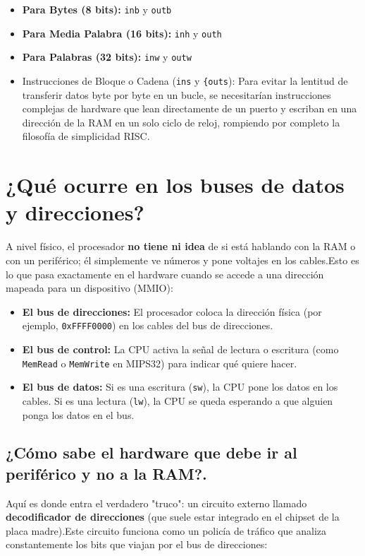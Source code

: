 \documentclass{article}
\begin{document}
\begin{itemize}
    \item \textbf{Para Bytes (8 bits):} \verb|inb| y \verb|outb|
    \item \textbf{Para Media Palabra (16 bits):} \verb|inh| y \verb|outh|
    \item \textbf{Para Palabras (32 bits):} \verb|inw| y \verb|outw|
    \item Instrucciones de Bloque o Cadena (\verb|ins| y \verb|{outs|): Para evitar la lentitud de transferir datos byte por byte en un bucle, se necesitarían instrucciones complejas de hardware que lean directamente de un puerto y escriban en una dirección de la RAM en un solo ciclo de reloj, rompiendo por completo la filosofía de simplicidad RISC.
\end{itemize}

\section{¿Qué ocurre en los buses de datos y direcciones?}
 
A nivel físico, el procesador \textbf{no tiene ni idea} de si está hablando con la RAM o con un periférico; él simplemente ve números y pone voltajes en los cables.Esto es lo que pasa exactamente en el hardware cuando se accede a una dirección mapeada para un dispositivo (MMIO): 


\begin{itemize}
    \item \textbf{El bus de direcciones:} El procesador coloca la dirección física (por ejemplo, \verb|0xFFFF0000|) en los cables del bus de direcciones.
    \item \textbf{El bus de control:} La CPU activa la señal de lectura o escritura (como \verb|MemRead| o \verb|MemWrite| en MIPS32) para indicar qué quiere hacer.
    \item \textbf{El bus de datos:} Si es una escritura (\verb|sw|), la CPU pone los datos en los cables. Si es una lectura (\verb|lw|), la CPU se queda esperando a que alguien ponga los datos en el bus.
\end{itemize}

 \subsection{¿Cómo sabe el hardware que debe ir al periférico y no a la RAM?.}

 Aquí es donde entra el verdadero "truco": un circuito externo llamado \textbf{decodificador de direcciones} (que suele estar integrado en el chipset de la placa madre).Este circuito funciona como un policía de tráfico que analiza constantemente los bits que viajan por el bus de direcciones:
\end{document}
